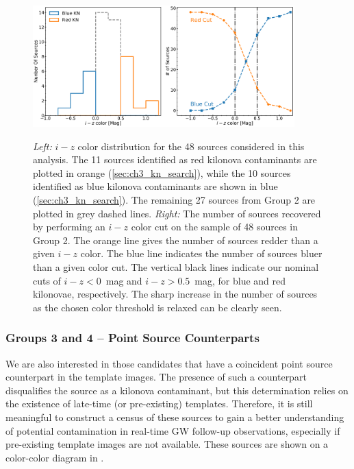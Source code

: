 \begin{figure}[!t]
\begin{center}
\hspace*{-0.1in}
\scalebox{1.}
{\includegraphics[width=0.9\textwidth]{./figs/chapter3/f3.pdf}}
\caption{{\it Left:} $i-z$ color distribution for the 48 sources considered in this analysis. The 11 sources identified as red kilonova contaminants are plotted in orange (\cref{sec:ch3_kn_search}), while the 10 sources identified as blue kilonova contaminants are shown in blue (\cref{sec:ch3_kn_search}). The remaining 27 sources from Group 2 are plotted in grey dashed lines.
{\it Right:} The number of sources recovered by performing an $i-z$ color cut on the sample of 48 sources in Group 2. The orange line gives the number of sources redder than a given $i-z$ color. The blue line indicates the number of sources bluer than a given color cut. The vertical black lines indicate our nominal cuts of $i-z < 0$~mag and $i-z > 0.5$~mag, for blue and red kilonovae, respectively. The sharp increase in the number of sources as the chosen color threshold is relaxed can be clearly seen.}
\label{fig:ch3_color_dist_final}
\end{center}
\end{figure}

\subsubsection{Groups 3 and 4 -- Point Source Counterparts}
\label{sec:ch3_pointsources}
We are also interested in those candidates that have a coincident point source counterpart in the template images. The presence of such a counterpart disqualifies the source as a kilonova contaminant, but this determination relies on the existence of late-time (or pre-existing) templates.  Therefore, it is still meaningful to construct a census of these sources to gain a better understanding of potential contamination in real-time GW follow-up observations, especially if pre-existing template images are not available. These sources are shown on a color-color diagram in .

